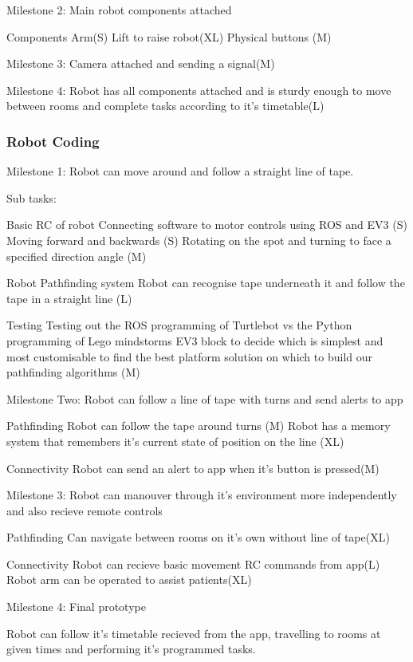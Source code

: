 \documentclass{article}
\begin{document}
Milestone 2: Main robot components attached

Components
    Arm(S)
    Lift to raise robot(XL)
    Physical buttons (M)
    
Milestone 3: Camera attached and sending a signal(M)

Milestone 4: Robot has all components attached and is sturdy enough to move between rooms and complete tasks according to it's timetable(L) 


\subsubsection{Robot Coding}

Milestone 1: Robot can move around and follow a straight line of tape.

Sub tasks: 

Basic RC of robot
    Connecting software to motor controls using ROS and EV3 (S)
    Moving forward and backwards (S)
    Rotating on the spot and turning to face a specified direction angle (M)
    
Robot Pathfinding system
    Robot can recognise tape underneath it and follow the tape in a straight line (L)
    
Testing
    Testing out the ROS programming of Turtlebot vs the Python programming of Lego mindstorms EV3 block to decide which is simplest and     most customisable to find the best platform solution on which to build our pathfinding algorithms (M)

Milestone Two: Robot can follow a line of tape with turns and send alerts to app 

Pathfinding
    Robot can follow the tape around turns (M)
    Robot has a memory system that remembers it's current state of position on the line (XL)
    
Connectivity    
    Robot can send an alert to app when it's button is pressed(M) 
    
Milestone 3: Robot can manouver through it's environment more independently and also recieve remote controls
    
Pathfinding
    Can navigate between rooms on it's own without line of tape(XL)
    
Connectivity 
    Robot can recieve basic movement RC commands from app(L)
    Robot arm can be operated to assist patients(XL)   
   
    
Milestone 4: Final prototype

Robot can follow it's timetable recieved from the app, travelling to rooms at given times and performing it's programmed tasks.
\end{document}
